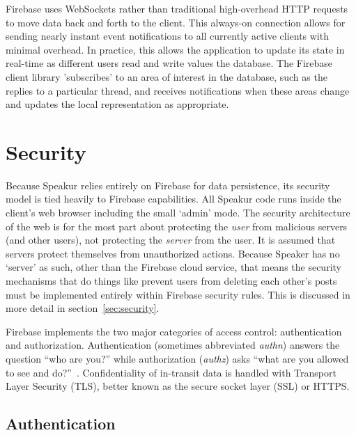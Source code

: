 Firebase uses WebSockets rather than traditional high-overhead HTTP requests to move data back and forth to the client.
This always-on connection allows for sending nearly instant event notifications to all currently active clients with minimal overhead.
In practice, this allows the application to update its state in real-time as different users read and write values the database.
The Firebase client library 'subscribes' to an area of interest in the database, such as the replies to a particular thread, and receives notifications when these areas change and updates the local representation as appropriate.

\section{Security}
\label{sec:arch_security}
Because Speakur relies entirely on Firebase for data persistence, its security model is tied heavily to Firebase capabilities. 
All Speakur code runs inside the client's web browser including the small `admin' mode.
The security architecture of the web is for the most part about protecting the \textit{user} from malicious servers (and other users), not protecting the \textit{server} from the user.
It is assumed that servers protect themselves from unauthorized actions.
Because Speaker has no `server' as such, 
other than the Firebase cloud service,
that means the security mechanisms that do things like prevent users from deleting each other's posts 
must be implemented entirely within Firebase security rules.
This is discussed in more detail in section~\ref{sec:security}.

Firebase implements the two major categories of access control: authentication and 
authorization. 
Authentication (sometimes abbreviated \textit{authn}) answers the question ``who are you?'' 
while authorization (\textit{authz}) asks ``what are you allowed to see and do?''~\cite{stallings2011}.
Confidentiality of in-transit data is handled with Transport Layer Security (TLS), 
better known as the secure socket layer (SSL) or HTTPS.


\subsection{Authentication}

